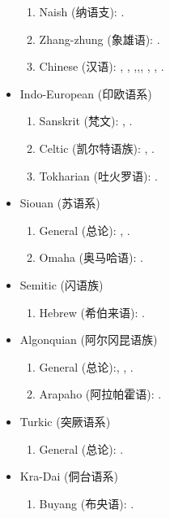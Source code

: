 \documentclass[oneside,a4paper,11pt]{article}
\newcommand{\zh}[1]{{\cn #1}}
\newcommand{\lingua}[3]{#1 (\zh{#3})}
\begin{document}
\begin{itemize}
\begin{enumerate}
\item \lingua{Naish}{Naish}{纳语支}: \cite{jacques.michaud11naish}.
\item  \lingua{Zhang-zhung}{Zhang-zhung}{象雄语}: \cite{jacques09zz}.
\item \lingua{Chinese}{Chinois}{汉语}:  \cite{jacques00ywij},  \cite{jacques03dissimilation},   \cite{jacques14honey},\cite{jacques15sr},\cite{jacques17genetic}, \cite{jacques17traditional}, \cite{jacques17buyang}, \cite{jacques16ssuffixes}.
\end{enumerate}
\item \lingua{Indo-European}{Indo-européen}{印欧语系}
\begin{enumerate}
\item \lingua{Sanskrit}{Sanskrit}{梵文}: \cite{jacques13vama}, \cite{jacques16camara}.
\item \lingua{Celtic}{Celtique}{凯尔特语族}: \cite{michaud-jacques12nasalite}, \cite{jacques15cochon}.
\item \lingua{Tokharian}{Tocharien}{吐火罗语}: \cite{jacques14honey}.
\end{enumerate}
\item \lingua{Siouan}{Sioux}{苏语系}
\begin{enumerate}
\item \lingua{General}{Général}{总论}: \cite{jacques12bear}, \cite{michaud-jacques12nasalite}.  
\item \lingua{Omaha}{Omaha}{奥马哈语}: \cite{jacques16ebde}.
\end{enumerate}
\item \lingua{Semitic}{Sémitique}{闪语族}
\begin{enumerate}
\item \lingua{Hebrew}{Hébreu}{希伯来语}: \cite{rg-gj12yod}.
\end{enumerate}
\item \lingua{Algonquian}{Algonquien}{阿尔冈昆语族}
\begin{enumerate}
\item \lingua{General}{Général}{总论}:\cite{jacques12bear}, \cite{jacques14inverse}, \cite{jacques18directionality}.
\item \lingua{Arapaho}{Arapaho}{阿拉帕霍语}: \cite{jacques13arapaho}.
\end{enumerate}
\item  \lingua{Turkic}{Turcique}{突厥语系}
\begin{enumerate}
\item \lingua{General}{Général}{总论}: \cite{antonov12kumush}.
\end{enumerate}
\item \lingua{Kra-Dai}{Kra-Dai}{侗台语系}
\begin{enumerate}
\item \lingua{Buyang}{Buyang}{布央语}: \cite{jacques17buyang}.
\end{enumerate}
\end{itemize}  
\end{document}

